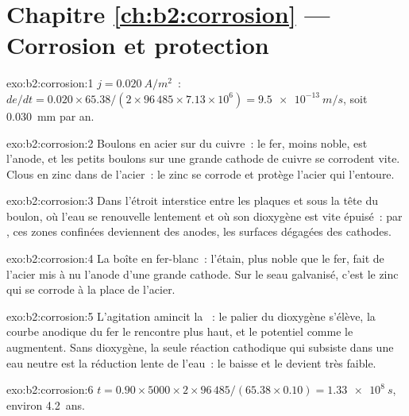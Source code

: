 \section*{Chapitre \ref{ch:b2:corrosion} --- Corrosion et protection}

\begin{solution}{exo:b2:corrosion:1}
$j = \qty{0.020}{A/m^2}$~: $de/dt = 0.020 \times 65.38/(2 \times 96\,485 \times 7.13
\times 10^6) = \qty{9.5e-13}{m/s}$, soit \qty{0.030}{mm} par an.
\end{solution}

\begin{solution}{exo:b2:corrosion:2}
Boulons en acier sur du cuivre~: le fer, moins noble, est l'anode, et les petits boulons
sur une grande cathode de cuivre se corrodent vite. Clous en zinc dans de l'acier~: le zinc se corrode
et protège l'acier qui l'entoure.
\end{solution}

\begin{solution}{exo:b2:corrosion:3}
Dans l'étroit interstice entre les plaques et sous la tête du boulon, où l'eau
se renouvelle lentement et où son dioxygène est vite épuisé~: par ,
ces zones confinées deviennent des anodes, les surfaces dégagées des cathodes.
\end{solution}

\begin{solution}{exo:b2:corrosion:4}
La boîte en fer-blanc~: l'étain, plus noble que le fer, fait de l'acier mis à nu l'anode d'une
grande cathode. Sur le seau galvanisé, c'est le zinc qui se corrode à la place de
l'acier.
\end{solution}

\begin{solution}{exo:b2:corrosion:5}
L'agitation amincit la ~: le palier du dioxygène s'élève, la courbe anodique
du fer le rencontre plus haut, et le potentiel comme le 
augmentent. Sans dioxygène, la seule réaction cathodique qui subsiste dans une eau
neutre est la réduction lente de l'eau~: le  baisse et le
 devient très faible.
\end{solution}

\begin{solution}{exo:b2:corrosion:6}
$t = 0.90 \times 5000 \times 2 \times 96\,485/(65.38 \times 0.10) = \qty{1.33e8}{s}$,
environ 4.2~ans.
\end{solution}

